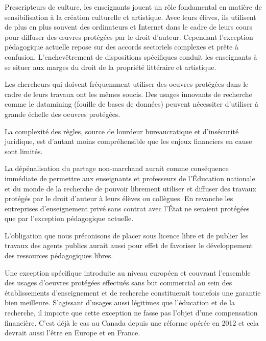 Prescripteurs de culture, les enseignants jouent un rôle fondamental en matière de sensibilisation à la création
culturelle et artistique. Avec leurs élèves, ils utilisent de plus en plus souvent des ordinateurs et Internet dans le cadre de leurs cours pour diffuser des œuvres protégées par le droit d'auteur. Cependant l'exception pédagogique actuelle repose sur des accords sectoriels complexes et prête à confusion. L’enchevêtrement de dispositions spécifiques conduit les enseignants à se situer aux marges du droit de la propriété littéraire et artistique.

Les chercheurs qui doivent fréquemment utiliser des oeuvres protégées dans le cadre de leurs travaux ont les mêmes soucis. Des usages innovants de recherche comme le datamining (fouille de bases de données) peuvent nécessiter d'utiliser à grande échelle des oeuvres protégées.  

La complexité des règles, source de lourdeur bureaucratique et d’insécurité juridique, est d’autant moins compréhensible que les enjeux financiers en cause sont limités.

La dépénalisation du partage non-marchand aurait comme conséquence immédiate de permettre aux enseignants et professeurs de l'Éducation nationale et du monde de la recherche de pouvoir librement utiliser et diffuser des travaux protégés par le droit d'auteur à leurs élèves ou collègues. En revanche les entreprises d'enseignement privé sans contrat avec l'État ne seraient protégées que par l'exception pédagogique actuelle. 

L'obligation que nous préconisons de placer sous licence libre et de publier les travaux des agents publics aurait aussi pour effet de favoriser le développement des ressources pédagogiques libres.

Une exception spécifique introduite au niveau européen et couvrant l'ensemble des usages d'oeuvres protégées effectués sans but commercial au sein des établissements d'enseignement et de recherche constituerait toutefois une garantie bien meilleure. S'agissant d'usages aussi légitimes que l'éducation et de la recherche, il importe que cette exception ne fasse pas l'objet d'une compensation financière. C'est déjà le cas au Canada depuis une réforme opérée en 2012 et cela devrait aussi l'être en Europe et en France.  


